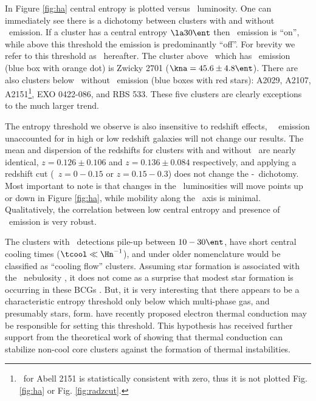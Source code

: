\documentclass{emulateapj}
\begin{document}
In Figure \ref{fig:ha} central entropy is plotted versus
\halpha\ luminosity. One can immediately see there is a dichotomy
between clusters with and without \halpha\ emission. If a cluster has
a central entropy $\la 30 \ent$ then \halpha\ emission is ``on'',
while above this threshold the emission is predominantly ``off''. For
brevity we refer to this threshold as \kthr\ hereafter. The cluster
above \kthr\ which has \halpha\ emission (blue box with orange dot) is
Zwicky 2701 ($\kna = 45.6 \pm 4.8 \ent$). There are also clusters
below \kthr\ without \halpha\ emission (blue boxes with red stars):
A2029, A2107, A2151\footnote{\kna\ for Abell 2151 is statistically
  consistent with zero, thus it is not plotted Fig. \ref{fig:ha} or
  Fig. \ref{fig:radzcut}.}, EXO 0422-086, and RBS 533. These five
clusters are clearly exceptions to the much larger trend.

The entropy threshold we observe is also insensitive to redshift
effects, \ie\ \halpha\ emission unaccounted for in high or low
redshift galaxies will not change our results. The mean and dispersion
of the redshifts for clusters with and without \halpha\ are nearly
identical, $z = 0.126 \pm 0.106$ and $z = 0.136 \pm 0.084$
respectively, and applying a redshift cut (\ie\ $z = 0-0.15$ or $z =
0.15-0.3$) does not change the \kna-\halpha\ dichotomy. Most important
to note is that changes in the \halpha\ luminosities will move points
up or down in Figure \ref{fig:ha}, while mobility along the \kna\ axis
is minimal. Qualitatively, the correlation between low central entropy
and presence of \halpha\ emission is very robust.

The clusters with \halpha\ detections pile-up between $10-30 \ent$,
have short central cooling times ($\tcool \ll \Hn^{-1}$), and under
older nomenclature would be classified as ``cooling flow''
clusters. Assuming star formation is associated with the
\halpha\ nebulosity \citep{voit97,cardiel98}, it does not come as a
surprise that modest star formation is occurring in these BCGs
\citep{johnstone87, mcnamara89}. But, it is very interesting that
there appears to be a characteristic entropy threshold only below
which multi-phase gas, and presumably stars, form. \cite{conduction}
have recently proposed electron thermal conduction may be responsible
for setting this threshold. This hypothesis has received further
support from the theoretical work of \cite{2008arXiv0804.3823G}
showing that thermal conduction can stabilize non-cool core clusters
against the formation of thermal instabilities.
\end{document}
